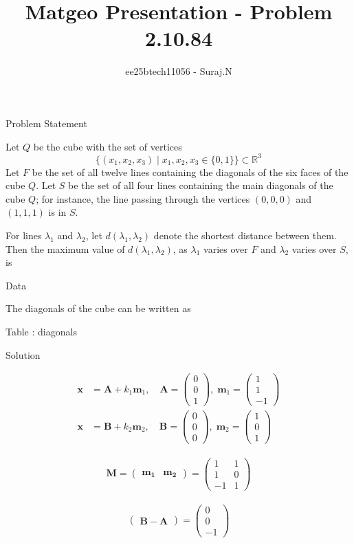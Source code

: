\documentclass{beamer}
\title{Matgeo Presentation - Problem 2.10.84}
\author{ee25btech11056 - Suraj.N}
\numberwithin{equation}{section}
\theoremstyle{remark}
\newcommand{\myvec}[1]{\ensuremath{\begin{pmatrix}#1\end{pmatrix}}}
\let\vec\mathbf
\begin{document}
\begin{frame}
  \titlepage
\end{frame}

\begin{frame}{Problem Statement}

Let $Q$ be the cube with the set of vertices 
\[
\{(x_1, x_2, x_3) \mid x_1, x_2, x_3 \in \{0,1\}\} \subset \mathbb{R}^3
\]
Let $F$ be the set of all twelve lines containing the diagonals of the six faces of the cube $Q$.  
Let $S$ be the set of all four lines containing the main diagonals of the cube $Q$; for instance, the line passing through the vertices $(0,0,0)$ and $(1,1,1)$ is in $S$.  

For lines $\lambda_1$ and $\lambda_2$, let $d(\lambda_1, \lambda_2)$ denote the shortest distance between them.  
Then the maximum value of $d(\lambda_1, \lambda_2)$, as $\lambda_1$ varies over $F$ and $\lambda_2$ varies over $S$, is 

\end{frame}

\begin{frame}{Data}

The diagonals of the cube can be written as 

\begin{table}[h!]
  \centering
  
  \caption*{Table : diagonals}
  \label{2.10.84}
\end{table}

\end{frame}

\begin{frame}{Solution}

\begin{align}
\vec{x} &= \vec{A} + k_1\vec{m}_1, \quad \vec{A} = \myvec{0\\0\\1}, \; \vec{m}_1 = \myvec{1\\1\\-1} \\
\vec{x} &= \vec{B} + k_2\vec{m}_2, \quad \vec{B} = \myvec{0\\0\\0}, \; \vec{m}_2 = \myvec{1\\0\\1}
\end{align}

\begin{align}
\vec{M} = \myvec{\vec{m_1} & \vec{m_2}} = \myvec{1 & 1 \\1 & 0 \\-1 & 1}
\end{align}

\begin{align}
  \myvec{\vec{B} - \vec{A}} = \myvec{0\\0\\-1}
\end{align}

\end{frame}
\end{document}
